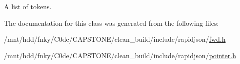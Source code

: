 A list of tokens. 



The documentation for this class was generated from the following files\+:\begin{DoxyCompactItemize}
\item 
/mnt/hdd/fnky/\+C0de/\+C\+A\+P\+S\+T\+O\+N\+E/clean\+\_\+build/include/rapidjson/\hyperlink{fwd_8h}{fwd.\+h}\item 
/mnt/hdd/fnky/\+C0de/\+C\+A\+P\+S\+T\+O\+N\+E/clean\+\_\+build/include/rapidjson/\hyperlink{pointer_8h}{pointer.\+h}\end{DoxyCompactItemize}
